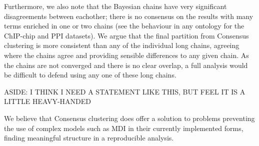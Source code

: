 \documentclass[]{article}
\begin{document}
Furthermore, we also note that the Bayesian chains have very significant disagreements between eachother; there is no consensus on the results with many terms enriched in one or two chains (see the behaviour in any ontology for the ChIP-chip and PPI datasets). We argue that the final partition from Consensus clustering is more consistent than any of the individual long chains, agreeing where the chains agree and providing sensible differences to any given chain. As the chains are not converged and there is no clear overlap, a full analysis would be difficult to defend using any one of these long chains. 

ASIDE: I THINK I NEED A STATEMENT LIKE THIS, BUT FEEL IT IS A LITTLE HEAVY-HANDED

We believe that Consensus clustering does offer a solution to problems preventing the use of complex models such as MDI in their currently implemented forms, finding meaningful structure in a reproducible analysis.

%
\end{document}
